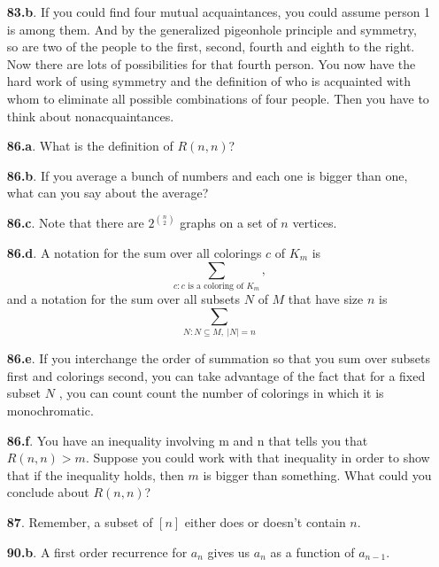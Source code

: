 \documentclass[10pt,]{book}
\theoremstyle{plain}
\theoremstyle{definition}
\theoremstyle{definition}
\numberwithin{equation}{chapter}
\begin{document}
\begin{itemize}[itemsep=1em]
\item[\textbf{83.b}.]If you could find four mutual acquaintances, you could assume person 1 is among them. And by the generalized pigeonhole principle and symmetry, so are two of the people to the first, second, fourth and eighth to the right. Now there are lots of possibilities for that fourth person. You now have the hard work of using symmetry and the definition of who is acquainted with whom to eliminate all possible combinations of four people. Then you have to think about nonacquaintances.%

\item[\textbf{86.a}.]What is the definition of \(R(n, n)\)?%

\item[\textbf{86.b}.]If you average a bunch of numbers and each one is bigger than one, what can you say about the average?%

\item[\textbf{86.c}.]Note that there are \(2^{\binom{n}{2}}\) graphs on a set of \(n\) vertices.%

\item[\textbf{86.d}.]A notation for the sum over all colorings \(c\) of \(K_m\) is%
\begin{equation*}
\sum_{c:c\mbox{~is a coloring of~} K_m},
\end{equation*}
and a notation for the sum over all subsets \(N\) of \(M\) that have size \(n\) is%
\begin{equation*}
\sum_{N:N\subseteq M,~|N|=n}
\end{equation*}
%

\item[\textbf{86.e}.]If you interchange the order of summation so that you sum over subsets first and colorings second, you can take advantage of the fact that for a fixed subset \(N\) , you can count count the number of colorings in which it is monochromatic.%

\item[\textbf{86.f}.]You have an inequality involving m and n that tells you that \(R(n, n) > m\). Suppose you could work with that inequality in order to show that if the inequality holds, then \(m\) is bigger than something. What could you conclude about \(R(n, n)\)?%

\item[\textbf{87}.]Remember, a subset of \([n]\) either does or doesn't contain \(n\).%

\item[\textbf{90.b}.]A first order recurrence for \(a_n\) gives us \(a_n\) as a function of \(a_{n-1}\).%


\end{itemize}
\end{document}
